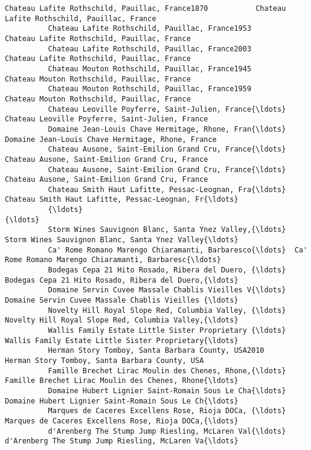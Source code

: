 \documentclass[11pt]{article}
\begin{document}
\begin{Verbatim}[commandchars=\\\{\}]
          Chateau Lafite Rothschild, Pauillac, France1870           Chateau Lafite Rothschild, Pauillac, France   
          Chateau Lafite Rothschild, Pauillac, France1953           Chateau Lafite Rothschild, Pauillac, France   
          Chateau Lafite Rothschild, Pauillac, France2003           Chateau Lafite Rothschild, Pauillac, France   
          Chateau Mouton Rothschild, Pauillac, France1945           Chateau Mouton Rothschild, Pauillac, France   
          Chateau Mouton Rothschild, Pauillac, France1959           Chateau Mouton Rothschild, Pauillac, France   
          Chateau Leoville Poyferre, Saint-Julien, France{\ldots}    Chateau Leoville Poyferre, Saint-Julien, France   
          Domaine Jean-Louis Chave Hermitage, Rhone, Fran{\ldots}  Domaine Jean-Louis Chave Hermitage, Rhone, France   
          Chateau Ausone, Saint-Emilion Grand Cru, France{\ldots}    Chateau Ausone, Saint-Emilion Grand Cru, France   
          Chateau Ausone, Saint-Emilion Grand Cru, France{\ldots}    Chateau Ausone, Saint-Emilion Grand Cru, France   
          Chateau Smith Haut Lafitte, Pessac-Leognan, Fra{\ldots}  Chateau Smith Haut Lafitte, Pessac-Leognan, Fr{\ldots}   
          {\ldots}                                                                                               {\ldots}   
          Storm Wines Sauvignon Blanc, Santa Ynez Valley,{\ldots}  Storm Wines Sauvignon Blanc, Santa Ynez Valley{\ldots}   
          Ca' Rome Romano Marengo Chiaramanti, Barbaresco{\ldots}  Ca' Rome Romano Marengo Chiaramanti, Barbaresc{\ldots}   
          Bodegas Cepa 21 Hito Rosado, Ribera del Duero, {\ldots}  Bodegas Cepa 21 Hito Rosado, Ribera del Duero,{\ldots}   
          Domaine Servin Cuvee Massale Chablis Vieilles V{\ldots}  Domaine Servin Cuvee Massale Chablis Vieilles {\ldots}   
          Novelty Hill Royal Slope Red, Columbia Valley, {\ldots}  Novelty Hill Royal Slope Red, Columbia Valley,{\ldots}   
          Wallis Family Estate Little Sister Proprietary {\ldots}  Wallis Family Estate Little Sister Proprietary{\ldots}   
          Herman Story Tomboy, Santa Barbara County, USA2010     Herman Story Tomboy, Santa Barbara County, USA   
          Famille Brechet Lirac Moulin des Chenes, Rhone,{\ldots}  Famille Brechet Lirac Moulin des Chenes, Rhone{\ldots}   
          Domaine Hubert Lignier Saint-Romain Sous Le Cha{\ldots}  Domaine Hubert Lignier Saint-Romain Sous Le Ch{\ldots}   
          Marques de Caceres Excellens Rose, Rioja DOCa, {\ldots}  Marques de Caceres Excellens Rose, Rioja DOCa,{\ldots}   
          d'Arenberg The Stump Jump Riesling, McLaren Val{\ldots}  d'Arenberg The Stump Jump Riesling, McLaren Va{\ldots}   

\end{Verbatim}
\end{document}
